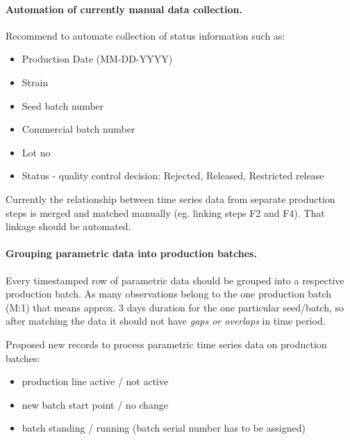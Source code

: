 \paragraph{Automation of currently manual data collection.}
Recommend to automate collection of status information such as:
\begin{itemize}
    \item Production Date (MM-DD-YYYY)
    \item Strain
    \item Seed batch number
    \item Commercial batch number
    \item Lot no
    \item Status - quality control decision: Rejected, Released, Restricted release
\end{itemize}

Currently the relationship between time series data from separate production steps is merged and matched manually (eg. linking steps F2 and F4). That linkage should be automated.

\paragraph{Grouping parametric data into production batches.}
Every time\-stamped row of parametric data should be grouped into a respective production batch. As many observations belong to the one production batch (M:1) that means approx. 3 days duration for the one particular seed/batch, so after matching the data it should not have \emph{gaps or overlaps} in time period.  

Proposed new records to process parametric time series data on production batches: 
\begin{itemize}
    \item production line active / not active
    \item new batch start point / no change
    \item batch standing / running (batch serial number has to be assigned) 
\end{itemize}

